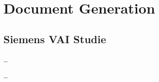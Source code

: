 \chapter{Document Generation}
\label{ch:Chapter3}

\section{Siemens VAI Studie}
\label{ch:Chapter3:sec:Section4}

\dots


\cite{becker2008a}
\dots

